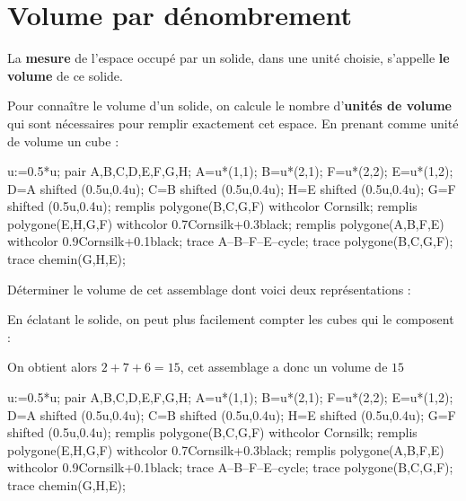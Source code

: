 \section{Volume par dénombrement}
\begin{definition}
    La \textbf{mesure} de l'espace occupé par un solide, dans une unité choisie, s'appelle {\bf le volume} de ce solide.
\end{definition}

\begin{methode*1}
    Pour connaître le volume d'un solide, on calcule le nombre d'{\bf unités de volume} qui sont nécessaires pour remplir exactement cet espace.
    \exercice
    En prenant comme unité de volume un cube : 
    \begin{Geometrie}
        u:=0.5*u;
        pair A,B,C,D,E,F,G,H;
        A=u*(1,1);
        B=u*(2,1);
        F=u*(2,2);
        E=u*(1,2);
        D=A shifted (0.5u,0.4u);
        C=B shifted (0.5u,0.4u);
        H=E shifted (0.5u,0.4u);
        G=F shifted (0.5u,0.4u);
        remplis polygone(B,C,G,F) withcolor Cornsilk;
        remplis polygone(E,H,G,F) withcolor 0.7Cornsilk+0.3black;
        remplis polygone(A,B,F,E) withcolor 0.9Cornsilk+0.1black;
        trace A--B--F--E--cycle;
        trace polygone(B,C,G,F);
        trace chemin(G,H,E);
    \end{Geometrie}

    Déterminer le volume de cet assemblage dont voici deux représentations :

    \correction
    En éclatant le solide, on peut plus facilement compter les cubes qui le composent :


    On obtient alors $2+7+6=15$, cet assemblage a donc un volume de $15$
    \begin{Geometrie}
        u:=0.5*u;
        pair A,B,C,D,E,F,G,H;
        A=u*(1,1);
        B=u*(2,1);
        F=u*(2,2);
        E=u*(1,2);
        D=A shifted (0.5u,0.4u);
        C=B shifted (0.5u,0.4u);
        H=E shifted (0.5u,0.4u);
        G=F shifted (0.5u,0.4u);
        remplis polygone(B,C,G,F) withcolor Cornsilk;
        remplis polygone(E,H,G,F) withcolor 0.7Cornsilk+0.3black;
        remplis polygone(A,B,F,E) withcolor 0.9Cornsilk+0.1black;
        trace A--B--F--E--cycle;
        trace polygone(B,C,G,F);
        trace chemin(G,H,E);
    \end{Geometrie}  
\end{methode*1}

